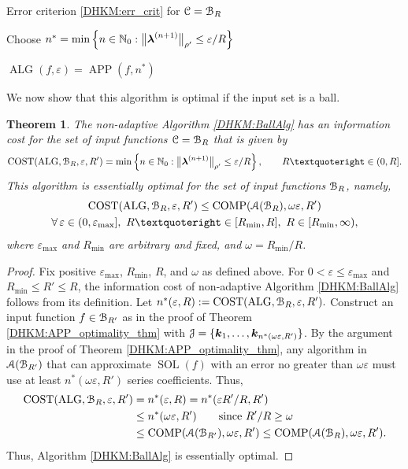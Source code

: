 \documentclass[USenglish]{article}
\theoremstyle{dgthm}
\newtheorem{theorem}{Theorem}
\theoremstyle{dgthm}
\theoremstyle{dgthm}
\theoremstyle{dgthm}
\theoremstyle{dgdef}
\theoremstyle{definition}
\DeclareMathOperator{\SOL}{SOL}
\DeclareMathOperator{\APP}{APP}
\DeclareMathOperator{\ALG}{ALG}
\DeclareMathOperator{\COST}{COST}
\DeclareMathOperator{\COMP}{COMP}
\newcommand{\bignorm}[2][{}]{\ensuremath{\bigl \lVert #2 \bigr \rVert}_{#1}}
\begin{document}
{\begin{algorithm}[H]
\begin{algorithmic}
    \Ensure Error criterion \eqref{DHKM:err_crit} for ${\mathcal{C}} = {\mathcal{B}}_{R}$

    \State Choose $n^* =  \min \left \{n \in \N_0 : \bignorm[\rho']{\bslambda^{(n+1)}} \le \varepsilon /R \right \}$

    \RETURN $\ALG(f,\varepsilon) = \APP(f,n^*)$
\end{algorithmic}
\end{algorithm}
We now show that this algorithm is optimal if the input set is a ball.
\begin{theorem}\label{DHKM:thm_cost_non_adapt}
The non-adaptive Algorithm \ref{DHKM:BallAlg} has an information cost for the set of input functions ${\mathcal{C}} = {\mathcal{B}}_R$ that is given by
\[
\COST(\ALG, \calB_R, \varepsilon,R') = \min \left \{n \in \N_0 : \bignorm[\rho']{\bslambda^{(n+1)}} \le \varepsilon /R \right \}, \qquad R’ \in (0, R].
\]
This algorithm is essentially optimal for the set of input functions ${\mathcal{B}}_R$, namely,
\begin{multline*}
\COST(\ALG, \calB_R, \varepsilon,R') \le \COMP(\calA(\calB_R),\omega \varepsilon ,R') \\ \forall \, \varepsilon \in (0, \varepsilon_{\max}], \ R’ \in  [ R_{\min} , R], \ R \in [R_{\min}, \infty), 
\end{multline*}
where $\varepsilon_{\max}$ and $R_{\min}$ are arbitrary and fixed, and $\omega = R_{\min}/R$.
\end{theorem}

\begin{proof}  Fix positive $\varepsilon_{\max}$, $R_{\min}$, $R$, and $\omega$ as defined above.  For $0 < \varepsilon \le \varepsilon_{\max}$ and $R_{\min} \le R' \le R$, the information cost of non-adaptive Algorithm  \ref{DHKM:BallAlg} follows from its definition.  Let 
$
n^*(\varepsilon,R) : = \COST(\ALG, \calB_R, \varepsilon,R').
$
Construct an input function $f \in {\mathcal{B}}_{R'}$ as in the proof of Theorem \ref{DHKM:APP_optimality_thm} with ${\mathcal{J}} = \{{\boldsymbol{k}}_1, \ldots, {\boldsymbol{k}}_{n^*(\omega \varepsilon,R')} \}$. By the argument in the proof of Theorem \ref{DHKM:APP_optimality_thm}, any algorithm in ${\mathcal{A}}({\mathcal{B}}_{R'})$ that can approximate $\SOL(f)$ with an error no greater than $\omega \varepsilon$ must use at least $n^*(\omega \varepsilon,R')$ series coefficients.  Thus, 
\begin{align*}
\COST(\ALG, \calB_R, \varepsilon,R') & =  n^*(\varepsilon,R) 
= n^*(\varepsilon R'/R,R') \\
& \le n^*(\omega \varepsilon, R') \qquad \text{since } R'/R \ge \omega
\\
& \le \COMP(\calA(\calB_{R'}),\omega \varepsilon, R') \le  \COMP(\calA(\calB_{R}),\omega \varepsilon, R').
\end{align*}
Thus, Algorithm \ref{DHKM:BallAlg} is essentially optimal.
\end{proof} \

}
\end{document}
